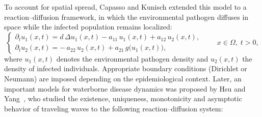 \documentclass[a4paper,11pt]{amsart}
\theoremstyle{definition}
\numberwithin{equation}{section}
\theoremstyle{definition}
\begin{document}
To account for spatial spread, Capasso and Kunisch \cite{Capasso1988} extended
this model to a reaction--diffusion framework, in which the environmental
pathogen diffuses in space while the infected population remains localized:
\begin{equation}\label{eq:capasso-pde}
\begin{cases}
\partial_t u_1(x,t) = d\,\Delta u_1(x,t) - a_{11}\,u_1(x,t) + a_{12}\,u_2(x,t),\\[0.4em]
\partial_t u_2(x,t) = -\,a_{22}\,u_2(x,t) + a_{21}\,g\!\big(u_1(x,t)\big),
\end{cases}
\qquad x \in \Omega, \; t>0,
\end{equation}
where $u_1(x,t)$ denotes the environmental pathogen density and $u_2(x,t)$
the density of infected individuals. Appropriate boundary conditions
(Dirichlet or Neumann) are imposed depending on the epidemiological
context. Later, an important models for waterborne disease dynamics was proposed by Hsu and Yang~\cite{Hsu2013}, who studied the existence, uniqueness, monotonicity and asymptotic behavior of traveling waves to the following reaction--diffusion system:
\end{document}
